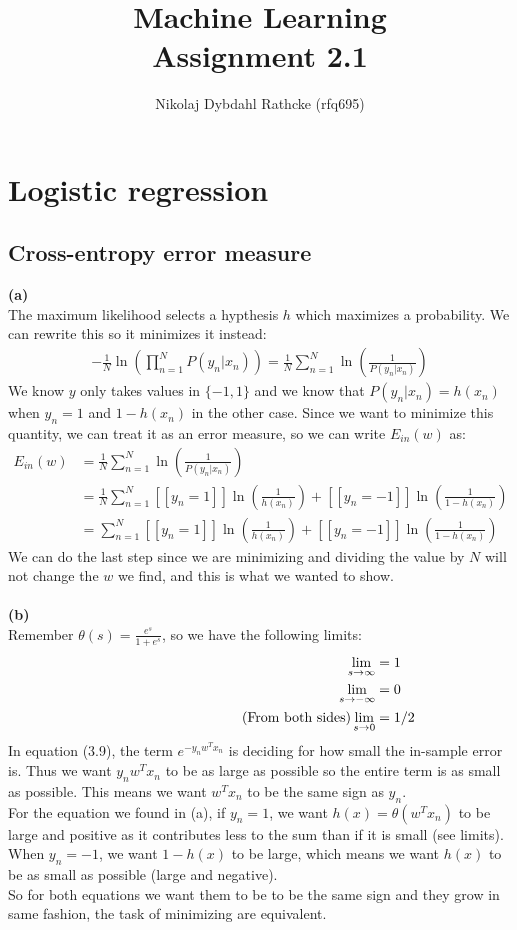\documentclass[a4paper]{article}
\author{Nikolaj Dybdahl Rathcke (rfq695)}
\title{Machine Learning \\ Assignment 2.1}
\newcommand{\comment}[1]{%
  \text{\phantom{(#1)}} \tag{#1}}
\def\el{[\![}
\def\er{]\!]}
\begin{document}
\maketitle

\section{Logistic regression}
\subsection{Cross-entropy error measure}
\textbf{(a)} \\
The maximum likelihood selects a hypthesis $h$ which maximizes a probability. We can rewrite this so it minimizes it instead:
\begin{align*}
-\frac{1}{N}\ln\left( \prod_{n=1}^N P(y_n|x_n) \right) = \frac{1}{N}\sum_{n=1}^N \ln\left( \frac{1}{P(y_n|x_n)} \right)
\end{align*}
We know $y$ only takes values in $\{-1,1\}$ and we know that $P(y_n|x_n)=h(x_n)$ when $y_n=1$ and $1-h(x_n)$ in the other case. Since we want to minimize this quantity, we can treat it as an error measure, so we can write $E_{in}(w)$ as:
\begin{align*}
E_{in}(w)&=\frac{1}{N}\sum_{n=1}^N \ln\left( \frac{1}{P(y_n|x_n)} \right) \\
&=\frac{1}{N}\sum_{n=1}^N \el y_n=1 \er \ln\left( \frac{1}{h(x_n)} \right) + \el y_n=-1 \er \ln\left( \frac{1}{1-h(x_n)} \right) \\
&=\sum_{n=1}^N \el y_n=1 \er \ln\left( \frac{1}{h(x_n)} \right) + \el y_n=-1 \er \ln\left( \frac{1}{1-h(x_n)} \right)
\end{align*}
We can do the last step since we are minimizing and dividing the value by $N$ will not change the $w$ we find, and this is what we wanted to show.\\
\\
\textbf{(b)} \\
Remember $\theta(s)=\frac{e^s}{1+e^s}$, so we have the following limits:
\begin{align*}
  \lim_{s\rightarrow \infty}&=1 \\
  \lim_{s\rightarrow -\infty}&=0 \\
  \comment{From both sides}  \lim_{s\rightarrow 0}&=1/2
\end{align*}
In equation (3.9), the term $e^{-y_nw^Tx_n}$ is deciding for how small the in-sample error is. Thus we want $y_nw^Tx_n$ to be as large as possible so the entire term is as small as possible. This means we want $w^Tx_n$ to be the same sign as $y_n$. \\
For the equation we found in (a), if $y_n=1$, we want $h(x)=\theta(w^Tx_n)$ to be large and positive as it contributes less to the sum than if it is small (see limits). When $y_n=-1$, we want $1-h(x)$ to be large, which means we want $h(x)$ to be as small as possible (large and negative). \\
So for both equations we want them to be to be the same sign and they grow in same fashion, the task of minimizing are equivalent.
\end{document}
